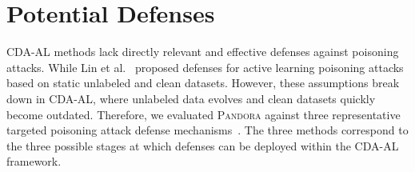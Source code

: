 \documentclass[lettersize,journal]{IEEEtran}
\newcommand{\pandora}{{\scshape Pandora}\xspace}
\begin{document}
\section{Potential Defenses}
\label{Sec: Potential Defenses}
CDA-AL methods lack directly relevant and effective defenses against poisoning attacks.
While Lin et al.~\cite{2021-GLOBALCOM-acctive-learning-under-malicious-mislabeling-poisoning-attacks} proposed defenses for active learning poisoning attacks based on static unlabeled and clean datasets. 
However, these assumptions break down in CDA-AL, where unlabeled data evolves and clean datasets quickly become outdated.
Therefore, we evaluated \pandora against three representative targeted poisoning attack defense mechanisms~\cite{chen2018detecting,DFP,2023-ICCV-Trigger-Detect}.
The three methods correspond to the three possible stages at which defenses can be deployed within the CDA-AL framework. 
\end{document}
